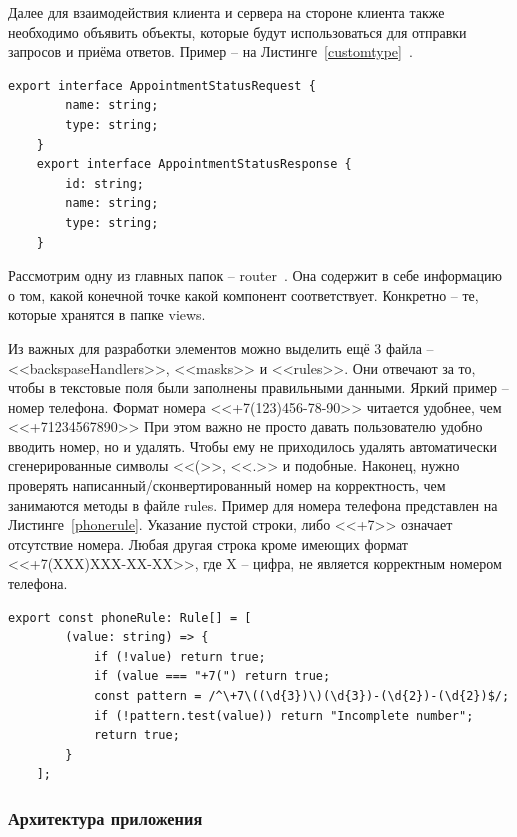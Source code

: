 \documentclass[a4paper,article]{article}
\begin{document}
\begin{sloppypar}
    Далее для взаимодействия клиента и сервера на стороне клиента также необходимо объявить объекты, которые будут использоваться для отправки запросов и приёма ответов. Пример -- на Листинге~\ref{customtype}~\cite{vuejs}.

    \begin{lstlisting}[label=customtype,caption=Пример объявленных типов для обмена сообщениями с сервером]
    export interface AppointmentStatusRequest {
        name: string;
        type: string;
    }
    export interface AppointmentStatusResponse {
        id: string;
        name: string;
        type: string;
    }
    \end{lstlisting}

    Рассмотрим одну из главных папок -- router~\cite{vuejs}. Она содержит в себе информацию о том, какой конечной точке какой компонент соответствует. Конкретно -- те, которые хранятся в папке views.

    Из важных для разработки элементов можно выделить ещё 3 файла -- <<backspaseHandlers>>, <<masks>> и <<rules>>. Они отвечают за то, чтобы в текстовые поля были заполнены правильными данными. Яркий пример -- номер телефона. Формат номера <<+7(123)456-78-90>> читается удобнее, чем <<+71234567890>> При этом важно не просто давать пользователю удобно вводить номер, но и удалять. Чтобы ему не приходилось удалять автоматически сгенерированные символы <<(>>, <<.>> и подобные. Наконец, нужно проверять написанный/сконвертированный номер на корректность, чем занимаются методы в файле rules. Пример для номера телефона представлен на Листинге~\ref{phonerule}. Указание пустой строки, либо <<+7>> означает отсутствие номера. Любая другая строка кроме имеющих формат <<+7(XXX)XXX-XX-XX>>, где X -- цифра, не является корректным номером телефона.

    \newpage

    \begin{lstlisting}[label=phonerule,caption=Пример проверки корректности телефона]
    export const phoneRule: Rule[] = [
        (value: string) => {
            if (!value) return true;
            if (value === "+7(") return true;
            const pattern = /^\+7\((\d{3})\)(\d{3})-(\d{2})-(\d{2})$/;
            if (!pattern.test(value)) return "Incomplete number";
            return true;
        }
    ];
    \end{lstlisting}

    \subsubsection{Архитектура приложения}\label{Реализация. Клиентская часть. Архитектура слоёв}


\end{sloppypar}
\end{document}
